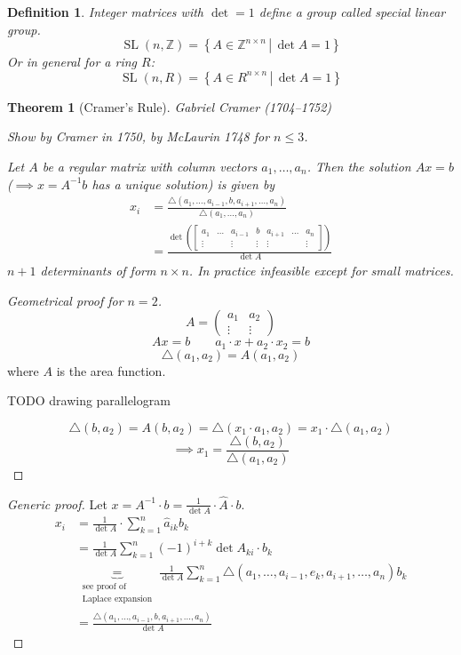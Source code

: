 \documentclass{article}
\newtheorem{theorem}{Theorem}  \numberwithin{theorem}{section}
\newtheorem{definition}{Definition}  \numberwithin{definition}{section}
\newcommand{\setdef}[2]{\left\{\left.#1\,\right|\,#2\right\}}
\begin{document}
\begin{definition}
  Integer matrices with $\det = 1$ define a group called \emph{special linear group}.
  \[ \operatorname{SL}(n, \mathbb Z) = \setdef{A \in \mathbb Z^{n \times n}}{\det{A} = 1} \]
  Or in general for a ring $R$:
  \[ \operatorname{SL}(n, R) = \setdef{A \in R^{n \times n}}{\det{A} = 1} \]
\end{definition}

\begin{theorem}[Cramer's Rule]
  Gabriel Cramer (1704--1752)

  Show by Cramer in 1750, by McLaurin 1748 for $n \leq 3$.

  Let $A$ be a regular matrix with column vectors $a_1, \dots, a_n$.
  Then the solution $Ax = b$ ($\implies x = A^{-1} b$ has a unique solution) is given by
  \begin{align*}
    x_i &= \frac{\triangle (a_1, \dots, a_{i-1}, b, a_{i+1}, \dots, a_n)}{\triangle (a_1, \dots, a_n)} \\
        &= \frac{\det\left(\begin{bmatrix} a_1 & \dots & a_{i-1} & b & a_{i+1} & \dots & a_{n} \\ \vdots &  & \vdots & \vdots & \vdots & & \vdots \end{bmatrix}\right)}{\det{A}}
  \end{align*}
  $n+1$ determinants of form $n \times n$. In practice infeasible except for small matrices.
\end{theorem}

\begin{proof}[Geometrical proof for $n=2$]
  \[ A = \begin{pmatrix} a_1 & a_2 \\ \vdots & \vdots \end{pmatrix} \]
  \[ Ax = b \qquad a_1 \cdot x + a_2 \cdot x_2 = b \]
  \[ \triangle (a_1, a_2) = A(a_1, a_2) \]
  where $A$ is the area function.

  TODO drawing parallelogram

  \[ \triangle(b, a_2) = A(b, a_2) = \triangle(x_1 \cdot a_1, a_2) = x_1 \cdot \triangle(a_1, a_2) \]
  \[ \implies x_1 = \frac{\triangle (b, a_2)}{\triangle (a_1, a_2)} \]
\end{proof}

\begin{proof}[Generic proof]
  Let $x = A^{-1} \cdot b = \frac{1}{\det{A}} \cdot \hat{A} \cdot b$.
  \begin{align*}
    x_i &= \frac{1}{\det{A}} \cdot \sum_{k=1}^n \hat{a}_{ik} b_k \\
        &= \frac{1}{\det{A}} \sum_{k=1}^n (-1)^{i+k} \det{A_{ki}} \cdot b_k \\
        &\underbrace{=}_{\substack{\text{see proof of} \\ \text{Laplace expansion}}} \frac{1}{\det{A}} \sum_{k=1}^n \triangle(a_1, \dots, a_{i-1}, e_k, a_{i+1}, \dots, a_n) b_k \\
        &= \frac{\triangle(a_1, \dots, a_{i-1}, b, a_{i+1}, \dots, a_n)}{\det{A}}
  \end{align*}
\end{proof}
\end{document}
